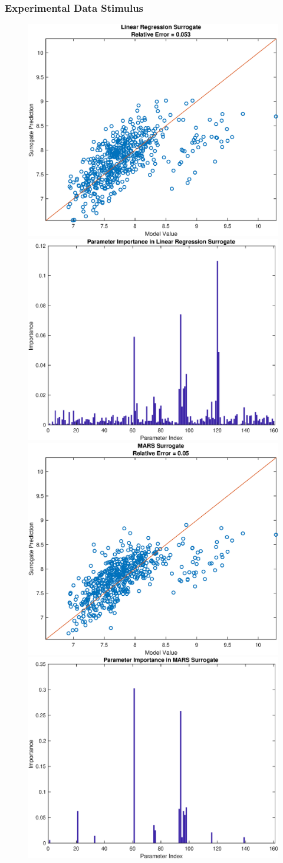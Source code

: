 \documentclass[12pt]{article}
\numberwithin{equation}{section}
\begin{document}
\newpage

\subsubsection{Experimental Data Stimulus}

\begin{figure}[h]
\centering
\includegraphics[width=.49 \textwidth]{Figures/K_ECS_Max_QoI_LR_Prediction_Experimental.eps}
\includegraphics[width=.49 \textwidth]{Figures/K_ECS_Max_QoI_LR_VI_Experimental.eps}\\
\includegraphics[width=.49 \textwidth]{Figures/K_ECS_Max_QoI_MARS_Prediction_Experimental.eps}
\includegraphics[width=.49 \textwidth]{Figures/K_ECS_Max_QoI_MARS_VI_Experimental.eps}
\end{figure}
\end{document}
